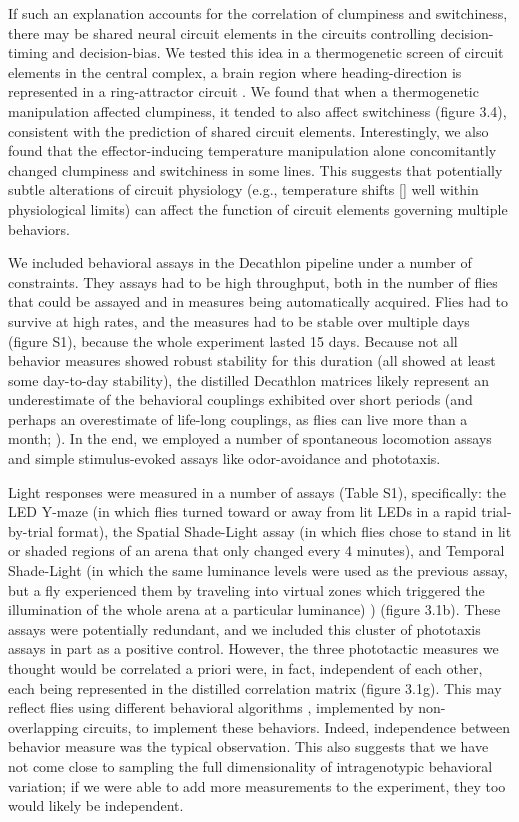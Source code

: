 \documentclass[12pt,letterpaper]{article}
\begin{document}
If such an explanation accounts for the correlation of clumpiness and switchiness, there may be shared neural circuit elements in the circuits controlling decision-timing and decision-bias. We tested this idea in a thermogenetic screen of circuit elements in the central complex, a brain region where heading-direction is represented \cite{Seelig_Neural_2015} in a ring-attractor circuit \cite{Kakaria_Ring_2017}. We found that when a thermogenetic manipulation affected clumpiness, it tended to also affect switchiness (figure 3.4), consistent with the prediction of shared circuit elements. Interestingly, we also found that the effector-inducing temperature manipulation alone concomitantly changed clumpiness and switchiness in some lines. This suggests that potentially subtle alterations of circuit physiology (e.g., temperature shifts [\cite{Haddad_Circuit_2018}] well within physiological limits) can affect the function of circuit elements governing multiple behaviors. 

We included behavioral assays in the Decathlon pipeline under a number of constraints. They assays had to be high throughput, both in the number of flies that could be assayed and in measures being automatically acquired. Flies had to survive at high rates, and the measures had to be stable over multiple days (figure S1), because the whole experiment lasted 15 days. Because not all behavior measures showed robust stability for this duration (all showed at least some day-to-day stability), the distilled Decathlon matrices likely represent an underestimate of the behavioral couplings exhibited over short periods (and perhaps an overestimate of life-long couplings, as flies can live more than a month; \cite{Linford_Measurement_2013}). In the end, we employed a number of spontaneous locomotion assays and simple stimulus-evoked assays like odor-avoidance and phototaxis. 

Light responses were measured in a number of assays (Table S1), specifically: the LED Y-maze \cite{Werkhoven_MARGO_2019} (in which flies turned toward or away from lit LEDs in a rapid trial-by-trial format), the Spatial Shade-Light assay (in which flies chose to stand in lit or shaded regions of an arena that only changed every 4 minutes), and Temporal Shade-Light (in which the same luminance levels were used as the previous assay, but a fly experienced them by traveling into virtual zones which triggered the illumination of the whole arena at a particular luminance) ) (figure 3.1b). These assays were potentially redundant, and we included this cluster of phototaxis assays in part as a positive control. However, the three phototactic measures we thought would be correlated a priori were, in fact, independent of each other, each being represented in the distilled correlation matrix (figure 3.1g). This may reflect flies using different behavioral algorithms \cite{Krakauer_Neuroscience_2017}, implemented by non-overlapping circuits, to implement these behaviors. Indeed, independence between behavior measure was the typical observation. This also suggests that we have not come close to sampling the full dimensionality of intragenotypic behavioral variation; if we were able to add more measurements to the experiment, they too would likely be independent.
\end{document}
